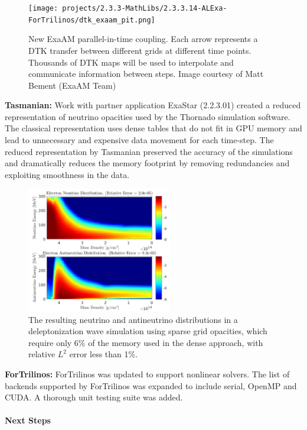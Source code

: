 \begin{figure}[htb]
        \centering \texttt{[image: projects/2.3.3-MathLibs/2.3.3.14-ALExa-ForTrilinos/dtk\_exaam\_pit.png]} \caption{\label{fig:dtk-exaam-pit}
        New ExaAM parallel-in-time coupling. Each arrow represents a DTK
        transfer between different grids at different time points. Thousands
        of DTK maps will be used to interpolate and communicate information
        between steps. Image courtesy of Matt Bement (ExaAM Team) }
\end{figure}

{\bf Tasmanian:} Work with partner application ExaStar (2.2.3.01) created a
reduced representation of neutrino opacities used by the Thornado simulation
software. The classical representation uses dense tables that do not fit in
GPU memory and lead to unnecessary and expensive data movement for each time-step.
The reduced representation by Tasmanian preserved the accuracy of the simulations
and dramatically reduces the memory footprint by removing redundancies
and exploiting smoothness in the data.

\begin{figure}[htb]
        \centering
        \includegraphics[width=2.5in]{projects/2.3.3-MathLibs/2.3.3.14-ALExa-ForTrilinos/tasmanian_exastar}
\caption{\label{fig:tasmanian-exastar}
		The resulting neutrino and antineutrino distributions in a deleptonization
		wave simulation using sparse grid opacities, which require only 6\% of
		the memory used in the dense approach, with relative $L^2$ error less than 1\%.}
\end{figure}

{\bf ForTrilinos:} ForTrilinos was updated to support nonlinear solvers. The
list of backends supported by ForTrilinos was expanded to include serial,
OpenMP and CUDA. A thorough unit testing suite was added.


\paragraph{Next Steps}

